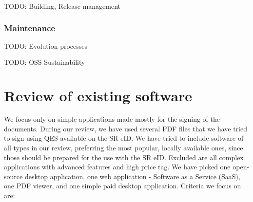 \documentclass[thesismargins, english, thesislinespacing, onelinechapterstyle, upjsfrontpage]{rnthesis}
\begin{document}
TODO: Building, Release management

\subsection{Maintenance}

TODO: Evolution processes

TODO: OSS Sustainability
\fi

\iffalse %
\chapter{Goals}

\section{Software}

TODO: Basis can be formed on the requirements article https://github.com/durasj/octosign/wiki/Initial-Requirements

TODO: Basic software requirements and more specific software requirements.

TODO: Enginnering parts - architecture, testing, maintainability.

TODO: Backends

\section{Information}

TODO: Website - multilingual, editable by the community
TODO: Global status - world map
\fi

\chapter{Review of existing software} \label{review}

We focus only on simple applications made mostly for the signing of the documents.
During our review, we have used several PDF files that we have tried to sign using QES available on the SR eID.
We have tried to include software of all types in our review, preferring the most popular, locally available ones, since those should be prepared for the use with the SR eID.
Excluded are all complex applications with advanced features and high price tag.
We have picked one open-source desktop application, one web application - Software as a Service (SaaS), one PDF viewer, and one simple paid desktop application. Criteria we focus on are:
\end{document}
